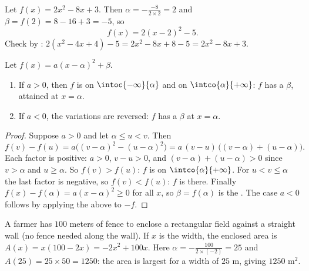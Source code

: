\begin{example}\label{ex:g11:quad:canonical}
Let $f(x) = 2x^2 - 8x + 3$. Then $\alpha = -\frac{-8}{2 \times 2} = 2$ and
$\beta = f(2) = 8 - 16 + 3 = -5$, so
\[
f(x) = 2(x - 2)^2 - 5 .
\]
Check by : $2(x^2 - 4x + 4) - 5 = 2x^2 - 8x + 8 - 5 =
2x^2 - 8x + 3$.
\end{example}

\begin{proposition}\label{prop:g11:quad:variations}
Let $f(x) = a(x-\alpha)^2 + \beta$.
\begin{enumerate}
  \item If $a > 0$, then $f$ is  on $\intoc{-\infty}{\alpha}$ and
         on $\intco{\alpha}{+\infty}$: $f$ has a \emph{}
        $\beta$, attained at $x = \alpha$.
  \item If $a < 0$, the variations are reversed: $f$ has a \emph{}
        $\beta$ at $x = \alpha$.
\end{enumerate}
\end{proposition}

\begin{proof}
Suppose $a > 0$ and let $\alpha \leq u < v$. Then
\[
f(v) - f(u) = a\bigl((v-\alpha)^2 - (u-\alpha)^2\bigr)
= a\,(v - u)\,\bigl((v-\alpha) + (u-\alpha)\bigr).
\]
Each factor is positive: $a > 0$, $v - u > 0$, and
$(v-\alpha) + (u-\alpha) > 0$ since $v > \alpha$ and $u \geq \alpha$. So
$f(v) > f(u)$: $f$ is  on $\intco{\alpha}{+\infty}$. For
$u < v \leq \alpha$ the last factor is negative, so $f(v) < f(u)$: $f$ is
 there. Finally $f(x) - f(\alpha) = a(x-\alpha)^2 \geq 0$ for all
$x$, so $\beta = f(\alpha)$ is the . The case $a < 0$ follows by
applying the above to $-f$.
\end{proof}

\begin{example}
A farmer has $100$ meters of fence to enclose a rectangular field against a
straight wall (no fence needed along the wall). If $x$ is the width, the
enclosed area is $A(x) = x(100 - 2x) = -2x^2 + 100x$. Here $\alpha =
-\frac{100}{2\times(-2)} = 25$ and $A(25) = 25 \times 50 = 1250$: the area
is largest for a width of $25$ m, giving $1250$ m$^2$.
\end{example}

